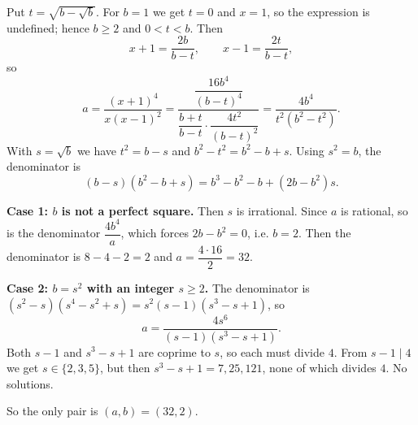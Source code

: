 Put $t=\sqrt{b-\sqrt b}$. For $b=1$ we get $t=0$ and $x=1$, so the expression is undefined; hence $b\ge2$ and $0<t<b$. Then
\[x+1=\dfrac{2b}{b-t},\qquad x-1=\dfrac{2t}{b-t},\]
so
\[a=\dfrac{(x+1)^4}{x(x-1)^2}=\dfrac{\dfrac{16b^4}{(b-t)^4}}{\dfrac{b+t}{b-t}\cdot\dfrac{4t^2}{(b-t)^2}}=\dfrac{4b^4}{t^2\left(b^2-t^2\right)}.\]
With $s=\sqrt b$ we have $t^2=b-s$ and $b^2-t^2=b^2-b+s$. Using $s^2=b$, the denominator is
\[(b-s)\left(b^2-b+s\right)=b^3-b^2-b+\left(2b-b^2\right)s.\]

\textbf{Case 1: $b$ is not a perfect square.} Then $s$ is irrational. Since $a$ is rational, so is the denominator $\dfrac{4b^4}a$, which forces $2b-b^2=0$, i.e. $b=2$. Then the denominator is $8-4-2=2$ and $a=\dfrac{4\cdot16}{2}=32$.

\textbf{Case 2: $b=s^2$ with an integer $s\ge2$.} The denominator is $\left(s^2-s\right)\left(s^4-s^2+s\right)=s^2(s-1)\left(s^3-s+1\right)$, so
\[a=\dfrac{4s^6}{(s-1)\left(s^3-s+1\right)}.\]
Both $s-1$ and $s^3-s+1$ are coprime to $s$, so each must divide $4$. From $s-1\mid4$ we get $s\in\{2,3,5\}$, but then $s^3-s+1=7,25,121$, none of which divides $4$. No solutions.

So the only pair is $\boxed{(a,b)=(32,2)}$.

